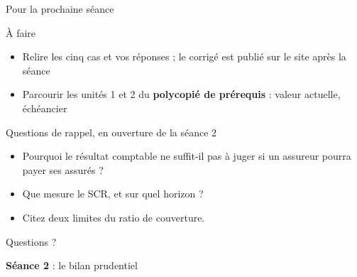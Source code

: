 \documentclass[10pt,aspectratio=169]{beamer}
\begin{document}
\begin{frame}{Pour la prochaine séance}
\begin{block}{À faire}
\begin{itemize}
  \item Relire les cinq cas et vos réponses ; le corrigé est publié sur le site après la séance
  \item Parcourir les unités 1 et 2 du \textbf{polycopié de prérequis} : valeur actuelle, échéancier
\end{itemize}
\end{block}
\begin{block}{Questions de rappel, en ouverture de la séance 2}
\begin{itemize}
  \item Pourquoi le résultat comptable ne suffit-il pas à juger si un assureur pourra payer ses assurés ?
  \item Que mesure le SCR, et sur quel horizon ?
  \item Citez deux limites du ratio de couverture.
\end{itemize}
\end{block}
\end{frame}

\begin{frame}[c]
\centering
\Huge Questions ?

\vspace{1cm}
\Large
\textbf{Séance 2} : le bilan prudentiel
\end{frame}
\end{document}
